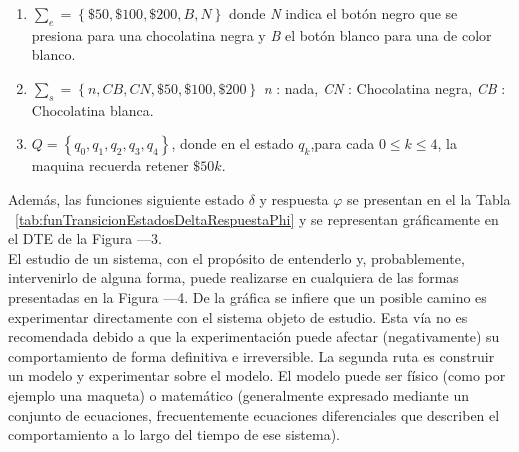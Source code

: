 \begin{enumerate}
    \item $\sum_{e}=\left\lbrace \$50,\$100,\$200,\textit{B},\textit{N} \right\rbrace$ donde \textit{N} indica el botón negro que se presiona para una chocolatina negra y \textit{B} el botón blanco para una de color blanco.
    \item $\sum_s=\left\lbrace \textit{n},\textit{CB},\textit{CN},\$50,\$100,\$200 \right\rbrace$ \textit{n} : nada, \textit{CN} : Chocolatina negra, \textit{CB} : Chocolatina blanca. 
    \item $Q=\left\lbrace q_0,q_1,q_2,q_3,q_4 \right\rbrace$, donde en el estado $q_k$,para cada $0 \leq k \leq 4$, la maquina recuerda retener $ \$50k $.
\end{enumerate}
Además, las funciones siguiente estado $\delta$ y respuesta $\varphi$ se presentan en el la Tabla ~\ref{tab:funTransicionEstadosDeltaRespuestaPhi} y se representan gráficamente en el DTE de la Figura —3.\\

El estudio de un sistema, con el propósito de entenderlo y, probablemente, intervenirlo de alguna forma, puede realizarse en cualquiera de las formas presentadas en la Figura —4. De la gráfica se infiere que un posible camino es experimentar directamente con el sistema objeto de estudio. Esta vía no es recomendada debido a que la experimentación puede afectar (negativamente) su comportamiento de forma definitiva e irreversible. La segunda ruta es construir un modelo y experimentar sobre el modelo. El modelo puede ser físico (como por ejemplo una maqueta) o matemático (generalmente expresado mediante un conjunto de ecuaciones, frecuentemente ecuaciones diferenciales que describen el comportamiento a lo largo del tiempo de ese sistema).\\



